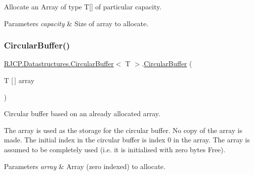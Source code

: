 Allocate an Array of type T\mbox{[}\mbox{]} of particular capacity. 


\begin{DoxyParams}{Parameters}
{\em capacity} & Size of array to allocate.\\
\hline
\end{DoxyParams}
\mbox{\label{class_r_j_c_p_1_1_datastructures_1_1_circular_buffer_af815d2e44d5045fa4fdea13bd1591ab5}} 
\subsubsection{\texorpdfstring{CircularBuffer()}{CircularBuffer()}\hspace{0.1cm}{\footnotesize\ttfamily [2/4]}}
{\footnotesize\ttfamily \mbox{\hyperlink{class_r_j_c_p_1_1_datastructures_1_1_circular_buffer}{R\+J\+C\+P.\+Datastructures.\+Circular\+Buffer}}$<$ T $>$.\mbox{\hyperlink{class_r_j_c_p_1_1_datastructures_1_1_circular_buffer}{Circular\+Buffer}} (\begin{DoxyParamCaption}\item[{T \mbox{[}$\,$\mbox{]}}]{array }\end{DoxyParamCaption})}



Circular buffer based on an already allocated array. 

The array is used as the storage for the circular buffer. No copy of the array is made. The initial index in the circular buffer is index 0 in the array. The array is assumed to be completely used (i.\+e. it is initialised with zero bytes Free). 


\begin{DoxyParams}{Parameters}
{\em array} & Array (zero indexed) to allocate.\\
\hline
\end{DoxyParams}
\mbox{\label{class_r_j_c_p_1_1_datastructures_1_1_circular_buffer_af7bb9c18806f30e833956805824fe59a}} 
